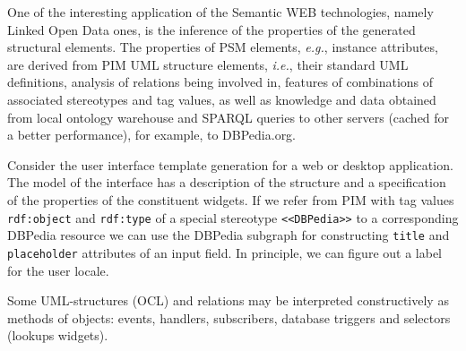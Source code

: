 \documentclass[runningheads]{llncs}
\begin{document}
One of the interesting application of the Semantic WEB technologies, namely Linked Open Data ones, is the inference of the properties of the generated structural elements.  The properties of PSM elements, \emph{e.g.}, instance attributes, are derived from PIM UML structure elements, \emph{i.e.}, their standard UML definitions, analysis of relations being involved in, features of combinations of associated stereotypes and tag values, as well as knowledge and data obtained from local ontology warehouse and SPARQL queries to other servers (cached for a better performance), for example, to DBPedia.org.

Consider the user interface template generation for a web or desktop application.  The model of the interface has a description of the structure and a specification of the properties of the constituent widgets.  If we refer from PIM with tag values \texttt{rdf:object} and \texttt{rdf:type} of a special stereotype \texttt{<<DBPedia>>} to a corresponding DBPedia resource we can use the DBPedia subgraph for constructing \texttt{title} and \texttt{placeholder} attributes of an input field.  In principle, we can figure out a label for the user locale.


Some UML-structures (OCL) and relations may be interpreted constructively as methods of objects: events, handlers, subscribers, database triggers and selectors (lookups widgets).


\end{document}
